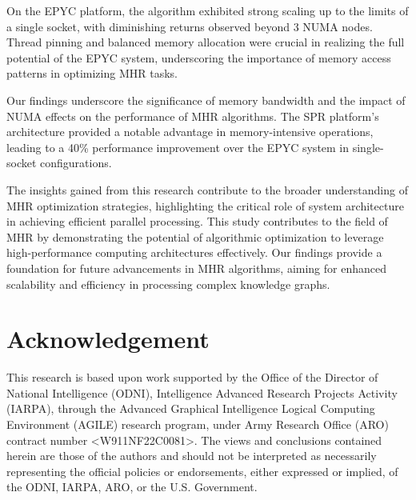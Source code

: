 \documentclass[sigconf]{acmart}
\begin{document}
On the EPYC platform, the algorithm exhibited strong scaling up to the limits of a single socket, with diminishing returns observed beyond 3 NUMA nodes. Thread pinning and balanced memory allocation were crucial in realizing the full potential of the EPYC system, underscoring the importance of memory access patterns in optimizing MHR tasks.

Our findings underscore the significance of memory bandwidth and the impact of NUMA effects on the performance of MHR algorithms. The SPR platform's architecture provided a notable advantage in memory-intensive operations, leading to a 40\% performance improvement over the EPYC system in single-socket configurations.

The insights gained from this research contribute to the broader understanding of MHR optimization strategies, highlighting the critical role of system architecture in achieving efficient parallel processing. This study contributes to the field of MHR by demonstrating the potential of algorithmic optimization to leverage high-performance computing architectures effectively. Our findings provide a foundation for future advancements in MHR algorithms, aiming for enhanced scalability and efficiency in processing complex knowledge graphs.

\section{Acknowledgement}
This research is based upon work supported by the Office of the Director of National Intelligence (ODNI), Intelligence Advanced Research Projects Activity (IARPA), through the Advanced Graphical Intelligence Logical Computing Environment (AGILE) research program, under Army Research Office (ARO) contract number <W911NF22C0081>. The views and conclusions contained herein are those of the authors and should not be interpreted as necessarily representing the official policies or endorsements, either expressed or implied, of the ODNI, IARPA, ARO, or the U.S. Government.





\appendix
\end{document}
